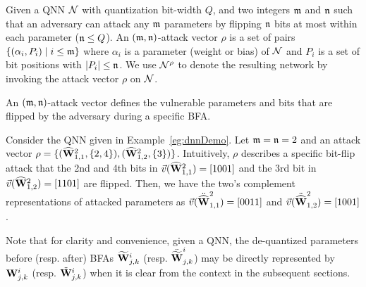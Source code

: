 \begin{definition}
    Given a QNN ${\mathcal{N}}$ with quantization bit-width $Q$, and two integers $\mathfrak{m}$ and $\mathfrak{n}$ such that an adversary can attack any $\mathfrak{m}$ parameters by flipping $\mathfrak{n}$ bits at most within each parameter ($\mathfrak{n}\le Q$). 
    An $(\mathfrak{m},\mathfrak{n})$-attack vector $\rho$ is a set of pairs $\{(\alpha_i, P_i) \mid i\le \mathfrak{m} \}$ where $\alpha_i$ is a parameter (weight or bias) of ${\mathcal{N}}$ and $P_i$ is a set of bit positions with $|P_i|\leq \mathfrak{n}$. 
    We use ${\mathcal{N}}^\rho$ to denote the resulting network by invoking the attack vector $\rho$ on ${\mathcal{N}}$. 
\end{definition}

An $(\mathfrak{m},\mathfrak{n})$-attack vector defines the vulnerable parameters and bits that are flipped by the adversary during a specific BFA. 
\begin{example}
    Consider the QNN given in Example~\ref{eg:dnnDemo}. Let $\mathfrak{m}=\mathfrak{n}=2$ and an attack vector $\rho=\{(\widehat{{\mathbf{W}}}^2_{1,1}, \{2,4\}),(\widehat{{\mathbf{W}}}^2_{1,2}, \{3\})\}$. Intuitively, $\rho$ describes a specific bit-flip attack that the 2nd and 4th bits in $\vec{v}(\widehat{{\mathbf{W}}}^2_{1,1})=[1001]$ and the 3rd bit in $\vec{v}(\widehat{{\mathbf{W}}}^2_{1,2})=[1101]$ are flipped. Then, we have the two's complement representations of attacked parameters as $\vec{v}(\ddot{\widehat{{\mathbf{W}}}}^2_{1,1})=[0011]$ and $\vec{v}(\ddot{\widehat{{\mathbf{W}}}}^2_{1,2})=[1001]$.
\end{example}

Note that for clarity and convenience, given a QNN, the de-quantized parameters before (resp. after) BFAs $\widetilde{{\mathbf{W}}}^i_{j,k}$ (resp. $\ddot{\widetilde{{\mathbf{W}}}}^i_{j,k}$) may be directly represented by ${\mathbf{W}}^i_{j,k}$ (resp. $\ddot{{\mathbf{W}}}^i_{j,k}$) when it is clear from the context in the subsequent sections.




